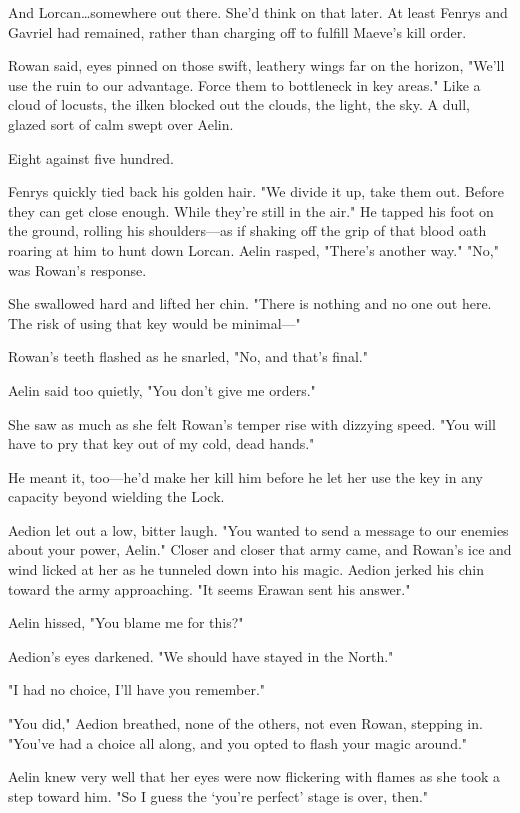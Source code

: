 And Lorcan\ldots somewhere out there.
She'd think on that later.
At least Fenrys and Gavriel had remained, rather than charging off to fulfill Maeve's kill order.

Rowan said, eyes pinned on those swift, leathery wings far on the horizon, "We'll use the ruin to our advantage.
Force them to bottleneck in key areas."
Like a cloud of locusts, the ilken blocked out the clouds, the light, the sky.
A dull, glazed sort of calm swept over Aelin.

Eight against five hundred.

Fenrys quickly tied back his golden hair.
"We divide it up, take them out.
Before they can get close enough.
While they're still in the air."
He tapped his foot on the ground, rolling his shoulders---as if shaking off the grip of that blood oath roaring at him to hunt down Lorcan.
Aelin rasped, "There's another way."
"No," was Rowan's response.

She swallowed hard and lifted her chin.
"There is nothing and no one out here.
The risk of using that key would be minimal---"

Rowan's teeth flashed as he snarled, "No, and that's final."

Aelin said too quietly, "You don't give me orders."

She saw as much as she felt Rowan's temper rise with dizzying speed.
"You will have to pry that key out of my cold, dead hands."

He meant it, too---he'd make her kill him before he let her use the key in any capacity beyond wielding the Lock.

Aedion let out a low, bitter laugh.
"You wanted to send a message to our enemies about your power, Aelin."
Closer and closer that army came, and Rowan's ice and wind licked at her as he tunneled down into his magic.
Aedion jerked his chin toward the army approaching.
"It seems Erawan sent his answer."

Aelin hissed, "You blame me for this?"

Aedion's eyes darkened.
"We should have stayed in the North."

"I had no choice, I'll have you remember."

"You did," Aedion breathed, none of the others, not even Rowan, stepping in.
"You've had a choice all along, and you opted to flash your magic around."

Aelin knew very well that her eyes were now flickering with flames as she took a step toward him.
"So I guess the `you're perfect' stage is over, then."

